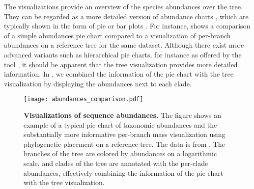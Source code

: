 The visualizations provide an overview of the species abundances over the tree.
They can be regarded as a more detailed version of abundance charts \cite{Huttenhower2012},
which are typically shown in the form of pie or bar plots \cite{Faust2015,Mahe2017,Lentendu2018}.
For instance,  shows a comparison of a simple abundances pie chart
compared to a visualization of per-branch abundances on a reference tree for the same dataset.
Although there exist more advanced variants such as
hierarchical pie charts, for instance as offered by the  tool \cite{Ondov2011},
it should be apparent that the tree visualization provides more detailed information.
In , we combined the information of the pie chart
with the tree visualization by displaying the abundances next to each clade.

\begin{figure}[!ht]
    \centering
    \texttt{[image: abundances\_comparison.pdf]}
    \begin{subfigure}{0pt}
        \label{fig:abundances_comparison:sub:pie_chart}
    \end{subfigure}
    \begin{subfigure}{0pt}
        \label{fig:abundances_comparison:sub:branch_colors}
    \end{subfigure}
    \caption[Visualizations of sequence abundances]{
        \textbf{Visualizations of sequence abundances.}
        The figure shows an example of
         a typical pie chart of taxonomic abundances and
         the substantially more informative
        per-branch mass visualization using phylogenetic placement on a reference tree.
        The data is from . %
        The branches of the tree are colored by abundances on a logarithmic scale,
        and clades of the tree are annotated with the per-clade abundances,
        effectively combining the information of the pie chart with the tree visualization.
    }
    \label{fig:abundances_comparison}
\end{figure}

